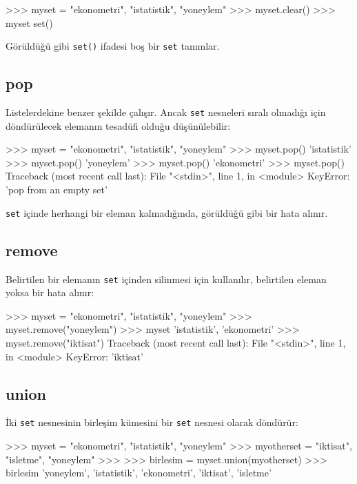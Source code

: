 \documentclass[12pt]{report}
\begin{document}
\begin{python}
>>> myset = {"ekonometri", "istatistik", "yoneylem"}
>>> myset.clear()
>>> myset
set()
\end{python}

Görüldüğü gibi \texttt{set()} ifadesi boş bir \texttt{set} tanımlar.


\subsection{pop}
Listelerdekine benzer şekilde çalışır. Ancak \texttt{set} nesneleri sıralı olmadığı için döndürülecek elemanın tesadüfi olduğu düşünülebilir:

\begin{python}
>>> myset = {"ekonometri", "istatistik", "yoneylem"}
>>> myset.pop()
'istatistik'
>>> myset.pop()
'yoneylem'
>>> myset.pop()
'ekonometri'
>>> myset.pop()
Traceback (most recent call last):
File "<stdin>", line 1, in <module>
KeyError: 'pop from an empty set'
\end{python}

\texttt{set} içinde herhangi bir eleman kalmadığında, görüldüğü gibi bir hata alınır. 


\subsection{remove}
Belirtilen bir elemanın \texttt{set} içinden silinmesi için kullanılır, belirtilen eleman yoksa bir hata alınır:

\begin{python}
>>> myset = {"ekonometri", "istatistik", "yoneylem"}
>>> myset.remove("yoneylem")
>>> myset
{'istatistik', 'ekonometri'}
>>> myset.remove("iktisat")
Traceback (most recent call last):
File "<stdin>", line 1, in <module>
KeyError: 'iktisat'
\end{python}

\subsection{union}
İki \texttt{set} nesnesinin birleşim kümesini bir \texttt{set} nesnesi olarak döndürür:

\begin{python}
>>> myset = {"ekonometri", "istatistik", "yoneylem"}
>>> myotherset = {"iktisat", "isletme", "yoneylem"}
>>> 
>>> birlesim = myset.union(myotherset)
>>> birlesim
{'yoneylem', 'istatistik', 'ekonometri', 'iktisat', 'isletme'}
\end{python}
\end{document}
